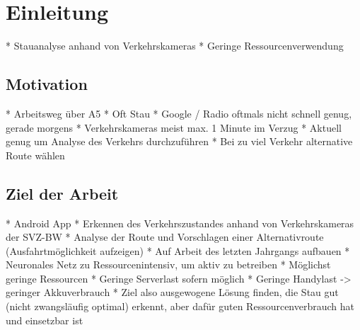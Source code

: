 \chapter{Einleitung}
\label{cha:Einleitung}
* Stauanalyse anhand von Verkehrskameras
* Geringe Ressourcenverwendung

\section{Motivation}
\label{sec:Motivation}
* Arbeitsweg über A5
* Oft Stau
* Google / Radio oftmals nicht schnell genug, gerade morgens
* Verkehrskameras meist max. 1 Minute im Verzug
* Aktuell genug um Analyse des Verkehrs durchzuführen
* Bei zu viel Verkehr alternative Route wählen

\section{Ziel der Arbeit}
\label{sec:ZielDerArbeit}
* Android App
* Erkennen des Verkehrszustandes anhand von Verkehrskameras der SVZ-BW
* Analyse der Route und Vorschlagen einer Alternativroute (Ausfahrtmöglichkeit aufzeigen)
* Auf Arbeit des letzten Jahrgangs aufbauen
* Neuronales Netz zu Ressourcenintensiv, um aktiv zu betreiben
* Möglichst geringe Ressourcen
* Geringe Serverlast sofern möglich
* Geringe Handylast -> geringer Akkuverbrauch
* Ziel also ausgewogene Lösung finden, die Stau gut (nicht zwangsläufig optimal) erkennt, aber dafür guten
	Ressourcenverbrauch hat und einsetzbar ist